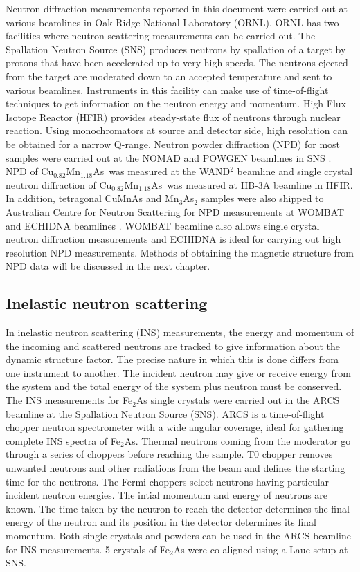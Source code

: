 \documentclass[10pt,doublespacing,edeposit]{uiucthesis2020}
\newcommand*{\cumnas}{Cu$_{0.82}$Mn$_{1.18}$As}
\begin{document}
\begin{mainmatter}
Neutron diffraction measurements reported in this document were carried out at various beamlines in Oak Ridge National Laboratory (ORNL). ORNL has two facilities where neutron scattering measurements can be carried out. The Spallation Neutron Source (SNS) \cite{mason2006spallation} produces neutrons by spallation of a target by protons that have been accelerated up to very high speeds. The neutrons ejected from the target are moderated down to an accepted temperature and sent to various beamlines. Instruments in this facility can make use of time-of-flight techniques to get information on the neutron energy and momentum. High Flux Isotope Reactor (HFIR) provides steady-state flux of neutrons through nuclear reaction. Using monochromators at source and detector side, high resolution can be obtained for a narrow Q-range. Neutron powder diffraction (NPD) for most samples were carried out at the NOMAD and POWGEN beamlines in SNS \cite{NEUEFEIND201268,Huq:in5025}. NPD of \cumnas\ was measured at the WAND$^2$ beamline \cite{Frontzek_new} and single crystal neutron diffraction of \cumnas\ was measured at HB-3A beamline in HFIR. In addition, tetragonal CuMnAs and Mn$_3$As$_2$ samples were also shipped to Australian Centre for Neutron Scattering for NPD measurements at WOMBAT and ECHIDNA beamlines \cite{STUDER20061013,Liss2006,Avdeev2018}. WOMBAT beamline also allows single crystal neutron diffraction measurements and ECHIDNA is ideal for carrying out high resolution NPD measurements. Methods of obtaining the magnetic structure from NPD data will be discussed in the next chapter.


\subsection{Inelastic neutron scattering}


In inelastic neutron scattering (INS) measurements, the energy and momentum of the incoming and scattered neutrons are tracked to give information about the dynamic structure factor. The precise nature in which this is done differs from one instrument to another. The incident neutron may give or receive energy from the system and the total energy of the system plus neutron must be conserved. The INS measurements for Fe$_2$As single crystals were carried out in the ARCS beamline \cite{doi:10.1063/1.3680104} at the Spallation Neutron Source (SNS). ARCS is a time-of-flight chopper neutron spectrometer with a wide angular coverage, ideal for gathering complete INS spectra of Fe$_2$As. Thermal neutrons coming from the moderator go through a series of choppers before reaching the sample. T0 chopper removes unwanted neutrons and other radiations from the beam and defines the starting time for the neutrons. The Fermi choppers select neutrons having particular incident neutron energies. The intial momentum and energy of neutrons are known. The time taken by the neutron to reach the detector determines the final energy of the neutron and its position in the detector determines its final momentum. Both single crystals and powders can be used in the ARCS beamline for INS measurements. 5 crystals of Fe$_2$As were co-aligned using a Laue setup at SNS.


\end{mainmatter}
\end{document}
